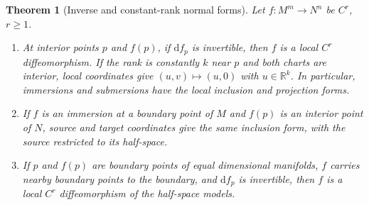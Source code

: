 \documentclass[11pt,oneside,openany]{book}
\newtheorem{theorem}{Theorem}[chapter]
\theoremstyle{definition}
\theoremstyle{remark}
\newcommand{\R}{\mathbb R}
\newcommand{\dd}{\mathrm d}
\begin{document}
\begin{theorem}[Inverse and constant-rank normal forms]\label{p104:M03.01}
Let \(f:M^m\to N^n\) be \(C^r\), \(r\geq1\).
\begin{enumerate}[label=\textup{(\alph*)}]
\item At interior points \(p\) and \(f(p)\), if \(\dd f_p\)
  is invertible, then \(f\) is a local \(C^r\) diffeomorphism.
  If the rank is constantly \(k\) near \(p\) and both
  charts are interior, local coordinates give
  \((u,v)\mapsto(u,0)\) with \(u\in\R^k\).
  In particular, immersions and submersions have
  the local inclusion and projection forms.
\item If \(f\) is an immersion at a boundary point of \(M\)
  and \(f(p)\) is an interior point of \(N\), source and
  target coordinates give the same inclusion form,
  with the source restricted to its half-space.
\item If \(p\) and \(f(p)\) are boundary points of equal
  dimensional manifolds, \(f\) carries nearby boundary
  points to the boundary, and \(\dd f_p\) is invertible,
  then \(f\) is a local \(C^r\) diffeomorphism of the
  half-space models.
\end{enumerate}
\end{theorem}
\end{document}
